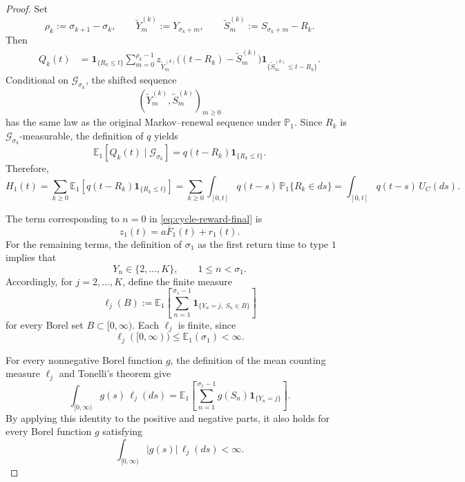 \documentclass[10pt,a4paper]{amsart}
\newcommand{\E}{\mathbb E}
\newcommand{\Pbb}{\mathbb P}
\newcommand{\ind}[1]{\mathbf 1_{\{#1\}}}
\begin{document}
\begin{proof}
Set
\[
  \rho_k:=\sigma_{k+1}-\sigma_k,\qquad
  \widetilde Y_m^{(k)}:=Y_{\sigma_k+m},\qquad
  \widetilde S_m^{(k)}:=S_{\sigma_k+m}-R_k.
\]
Then
\[
\begin{split}
  Q_k(t)
  &=
  \ind{R_k\le t}
  \sum_{m=0}^{\rho_k-1}
  z_{\widetilde Y_m^{(k)}}
  \bigl((t-R_k)-\widetilde S_m^{(k)}\bigr)
  \ind{\widetilde S_m^{(k)}\le t-R_k}.
\end{split}
\]
Conditional on \(\mathcal G_{\sigma_k}\), the shifted sequence
\[
  \left(
    \widetilde Y_m^{(k)},
    \widetilde S_m^{(k)}
  \right)_{m\ge0}
\]
has the same law as the original Markov--renewal sequence under
\(\Pbb_1\). Since \(R_k\) is \(\mathcal G_{\sigma_k}\)-measurable, the
definition of \(q\) yields
\[
  \E_1\left[
    Q_k(t)\mid\mathcal G_{\sigma_k}
  \right]
  =
  q(t-R_k)\ind{R_k\le t}.
\]
Therefore,
\begin{equation}\label{eq:H1-cycle-final}
H_1(t)=
  \sum_{k\ge0}
  \E_1\left[
    q(t-R_k)\ind{R_k\le t}
  \right]=
  \sum_{k\ge0}
  \int_{[0,t]}q(t-s)\,\Pbb_1\{R_k\in ds\}=
  \int_{[0,t]}q(t-s)\,U_C(ds).
\end{equation}

The term corresponding to \(n=0\) in \eqref{eq:cycle-reward-final} is
\[
  z_1(t)=a\overline F_1(t)+r_1(t).
\]
For the remaining terms, the definition of \(\sigma_1\) as the first
return time to type \(1\) implies that
\[
  Y_n\in\{2,\dots,K\},
  \qquad 1\le n<\sigma_1.
\]
Accordingly, for \(j=2,\dots,K\), define the finite measure
\[
  \ell_j(B):=
  \E_1\left[
    \sum_{n=1}^{\sigma_1-1}
    \ind{Y_n=j,\ S_n\in B}
  \right]
\]
for every Borel set \(B\subset[0,\infty)\). Each \(\ell_j\) is finite,
since
\[
  \ell_j([0,\infty))
  \le
  \E_1(\sigma_1)
  <\infty.
\]

For every nonnegative Borel function \(g\), the definition of the mean
counting measure \(\ell_j\) and Tonelli's theorem give
\[
  \int_{[0,\infty)}g(s)\,\ell_j(ds)
  =
  \E_1\left[
    \sum_{n=1}^{\sigma_1-1}
    g(S_n)\ind{Y_n=j}
  \right].
\]
By applying this identity to the positive and negative parts, it also
holds for every Borel function \(g\) satisfying
\[
  \int_{[0,\infty)}|g(s)|\,\ell_j(ds)<\infty.
\]


\end{proof}
\end{document}
